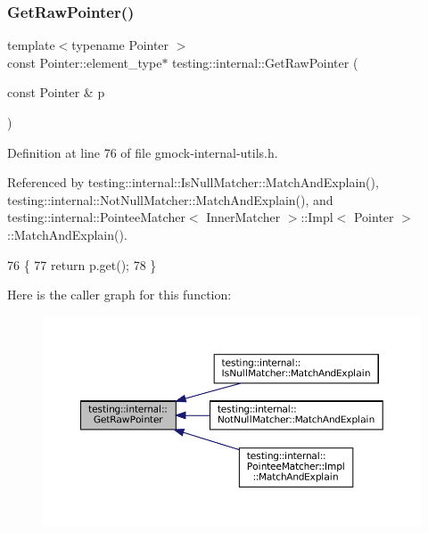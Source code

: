 \subsubsection{\texorpdfstring{Get\+Raw\+Pointer()}{GetRawPointer()}\hspace{0.1cm}{\footnotesize\ttfamily [1/2]}}
{\footnotesize\ttfamily template$<$typename Pointer $>$ \\
const Pointer\+::element\+\_\+type$\ast$ testing\+::internal\+::\+Get\+Raw\+Pointer (\begin{DoxyParamCaption}\item[{const Pointer \&}]{p }\end{DoxyParamCaption})\hspace{0.3cm}{\ttfamily [inline]}}



Definition at line 76 of file gmock-\/internal-\/utils.\+h.



Referenced by testing\+::internal\+::\+Is\+Null\+Matcher\+::\+Match\+And\+Explain(), testing\+::internal\+::\+Not\+Null\+Matcher\+::\+Match\+And\+Explain(), and testing\+::internal\+::\+Pointee\+Matcher$<$ Inner\+Matcher $>$\+::\+Impl$<$ Pointer $>$\+::\+Match\+And\+Explain().


\begin{DoxyCode}
76                                                                            \{
77   \textcolor{keywordflow}{return} p.get();
78 \}
\end{DoxyCode}
Here is the caller graph for this function\+:
\nopagebreak
\begin{figure}[H]
\begin{center}
\leavevmode
\includegraphics[width=350pt]{namespacetesting_1_1internal_ae88d1a6f95165c43c27a6c0e2d357e61_icgraph}
\end{center}
\end{figure}
\mbox{\label{namespacetesting_1_1internal_a4d17b114b61b805ac5f37e9c26e29e55}} 
